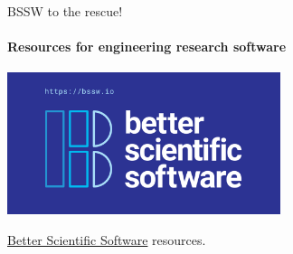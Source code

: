 \begin{frame}{BSSW to the rescue!}
\framesubtitle{Resources for engineering research software}
    \vfill

    \begin{center}
    \includegraphics[width=0.6\textwidth]{figures/bssw.png}
    \end{center}
    \href{https://bssw.io}{Better Scientific Software} resources. 

\end{frame}


